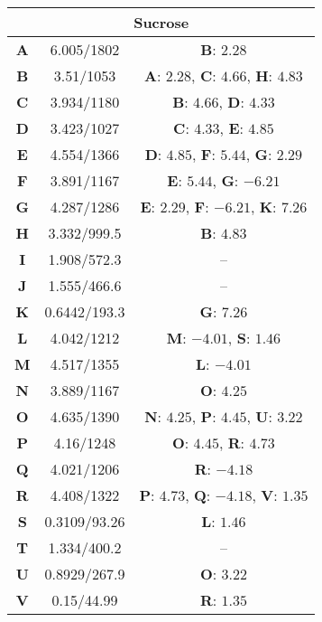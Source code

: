\begin{longtable}[h!]{c c c}
\hline
\multicolumn{3}{c}{\textbf{Sucrose}}\\
\hline
\textbf{A} & 6.005/1802 & \textbf{B}: $2.28$ \\
\textbf{B} & 3.51/1053 & \textbf{A}: $2.28$, \textbf{C}: $4.66$, \textbf{H}: $4.83$ \\
\textbf{C} & 3.934/1180 & \textbf{B}: $4.66$, \textbf{D}: $4.33$ \\
\textbf{D} & 3.423/1027 & \textbf{C}: $4.33$, \textbf{E}: $4.85$ \\
\textbf{E} & 4.554/1366 & \textbf{D}: $4.85$, \textbf{F}: $5.44$, \textbf{G}: $2.29$ \\
\textbf{F} & 3.891/1167 & \textbf{E}: $5.44$, \textbf{G}: $-6.21$ \\
\textbf{G} & 4.287/1286 & \textbf{E}: $2.29$, \textbf{F}: $-6.21$, \textbf{K}: $7.26$ \\
\textbf{H} & 3.332/999.5 & \textbf{B}: $4.83$ \\
\textbf{I} & 1.908/572.3 & -- \\
\textbf{J} & 1.555/466.6 & -- \\
\textbf{K} & 0.6442/193.3 & \textbf{G}: $7.26$ \\
\textbf{L} & 4.042/1212 & \textbf{M}: $-4.01$, \textbf{S}: $1.46$ \\
\textbf{M} & 4.517/1355 & \textbf{L}: $-4.01$ \\
\textbf{N} & 3.889/1167 & \textbf{O}: $4.25$ \\
\textbf{O} & 4.635/1390 & \textbf{N}: $4.25$, \textbf{P}: $4.45$, \textbf{U}: $3.22$ \\
\textbf{P} & 4.16/1248 & \textbf{O}: $4.45$, \textbf{R}: $4.73$ \\
\textbf{Q} & 4.021/1206 & \textbf{R}: $-4.18$ \\
\textbf{R} & 4.408/1322 & \textbf{P}: $4.73$, \textbf{Q}: $-4.18$, \textbf{V}: $1.35$ \\
\textbf{S} & 0.3109/93.26 & \textbf{L}: $1.46$ \\
\textbf{T} & 1.334/400.2 & -- \\
\textbf{U} & 0.8929/267.9 & \textbf{O}: $3.22$ \\
\textbf{V} & 0.15/44.99 & \textbf{R}: $1.35$ \\

\hline
\end{longtable}
